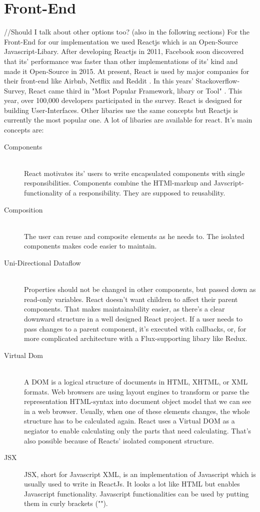 \section{Front-End}
//Should I talk about other options too? (also in the following sections)
For the Front-End for our implementation we used Reactjs which is an Open-Source Javascript-Libary.
After developing Reactjs in 2011, Facebook soon discovered that its' performance was faster than other implementations of its' kind and made it Open-Source in 2015. 
At present, React is used by major companies for their front-end like Airbnb, Netflix and Reddit \parencite{reactjsUsers}. 
In this years' Stackoverflow-Survey, React came third in "Most Popular Framework, libary or Tool" \parencite{stackOverflowSurvey}. 
This year, over 100,000 developers participated in the survey. 
React is designed for building User-Interfaces. Other libaries %
use the same concepts but Reactjs is currently the most popular one.
A lot of libaries are available for react. 
It's main concepts are:
\begin{description}
    \item[Components] \hfill \\
    React motivates its' users to write encapsulated components with single responsibilities. Components combine the HTMl-markup and Javscript-functionality of a responsibility. They are supposed to reusability. %
    \item[Composition] \hfill \\
    The user can reuse and composite elements as he needs to. The isolated components makes code easier to maintain. 
    \item[Uni-Directional Dataflow] \hfill \\
            Properties should not be changed in other components, but passed down as read-only variables. 
            React doesn't want children to affect their parent components. That makes maintainability easier, as there's a clear downward structure in a well designed React project.
            If a user needs to pass changes to a parent component, it's executed with callbacks, or, for more complicated architecture with a Flux-supporting libary like Redux.
    \item[Virtual Dom]\hfill \\
    A DOM%
    is a logical structure of documents in HTML, XHTML, or XML formats. 
    Web browsers are using layout engines to transform or parse the representation HTML-syntax into document object model that we can see in a web browser.
    Usually, when one of these elements changes, the whole structure has to be calculated again. 
    React uses a Virtual DOM as a negiator to enable calculating only the parts that need calculating. That's also possible because of Reacts' isolated component structure.
    \item[JSX]  JSX, short for Javascript XML, is an implementation of Javascript which is usually used to write in ReactJs. 
    It looks a lot like HTML but enables Javascript functionality. Javascript functionalities can be used by putting them in curly brackets ("{}").
\end{description}
